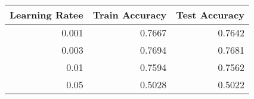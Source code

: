 \begin{tabular}{|r||r|r|}
\hline
Learning Ratee & Train Accuracy & Test Accuracy \\
\hline
0.001 & 0.7667 & 0.7642 \\
0.003 & 0.7694 & 0.7681 \\
0.01 & 0.7594 & 0.7562 \\
0.05 & 0.5028 & 0.5022 \\
\hline
\end{tabular}

